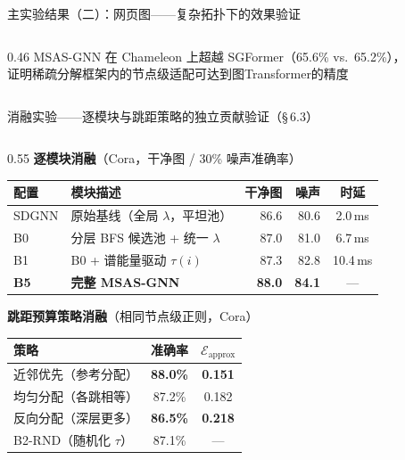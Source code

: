 \documentclass[aspectratio=169,9pt,xcolor=dvipsnames]{beamer}
\newcommand{\highlight}[1]{\textcolor{myred}{\textbf{#1}}}
\newcommand{\blue}[1]{\textcolor{mynavy}{#1}}
\newcommand{\green}[1]{\textcolor{mygreen}{#1}}
\begin{document}
\begin{frame}{主实验结果（二）：网页图——复杂拓扑下的效果验证}
\begin{columns}[T]
\begin{column}{0.46\textwidth}
      \vspace{0.1cm}
      MSAS-GNN 在 Chameleon 上超越 SGFormer（65.6\% vs.\ 65.2\%），\\
      证明稀疏分解框架内的节点级适配可达到图Transformer的精度
    \end{column}
  \end{columns}
\end{frame}

\begin{frame}{消融实验——逐模块与跳距策略的独立贡献验证（§\,6.3）}
  \begin{columns}[T]
    \begin{column}{0.55\textwidth}
      \textbf{\blue{逐模块消融}}（Cora，干净图 / 30\% 噪声准确率）
      \begin{center}\small
      \begin{tabular}{m{0.75cm}m{3.5cm}rrc}
        \toprule
        配置 & 模块描述 & 干净图 & 噪声 & 时延\\
        \midrule
        SDGNN & 原始基线（全局 $\lambda$，平坦池） & 86.6 & 80.6 & 2.0\,ms\\
        B0    & 分层 BFS 候选池 + 统一 $\lambda$ & 87.0 & 81.0 & 6.7\,ms\\
        B1    & B0 + 谱能量驱动 $\tau(i)$ & 87.3 & 82.8 & 10.4\,ms\\
        \textbf{B5} & \textbf{完整 MSAS-GNN} & \textbf{88.0} & \textbf{84.1} & —\\
        \bottomrule
      \end{tabular}
      \end{center}

      \vspace{0.15cm}
      \textbf{\blue{跳距预算策略消融}}（相同节点级正则，Cora）
      \begin{center}\small
      \begin{tabular}{m{3.0cm}cc}
        \toprule
        策略 & 准确率 & $\mathcal{E}_{\mathrm{approx}}$\\
        \midrule
        近邻优先（参考分配） & \green{\textbf{88.0\%}} & \green{\textbf{0.151}}\\
        均匀分配（各跳相等） & 87.2\% & 0.182\\
        反向分配（深层更多） & \highlight{86.5\%} & \highlight{0.218}\\
        B2-RND（随机化 $\tau$） & 87.1\% & —\\
        \bottomrule
      \end{tabular}
      \end{center}
    \end{column}


\end{columns}
\end{frame}
\end{document}
